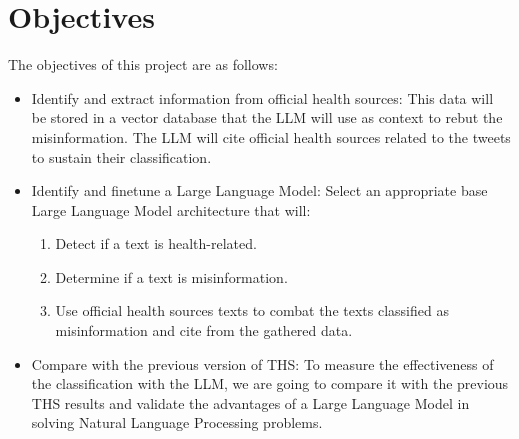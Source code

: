 \section{Objectives}

\noindent
The objectives of this project are as follows:
\begin{itemize}
	\item Identify and extract information from official health sources: This data will be stored in a vector database that the LLM  will use as context to rebut the misinformation. The LLM will cite official health sources related to the tweets to sustain their classification.
	\item Identify and finetune a Large Language Model: Select an appropriate base Large Language Model architecture that will:
	\begin{enumerate}
		\item Detect if a text is health-related.
		\item Determine if a text is misinformation.
		\item Use official health sources texts to combat the texts classified as misinformation and cite from the gathered data.
	\end{enumerate}
	\item Compare with the previous version of THS: To measure the effectiveness of the classification with the LLM, we are going to compare it with the previous THS results and validate the advantages of a Large Language Model in solving Natural Language Processing problems. 
\end{itemize}


